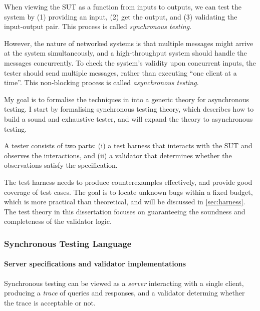 \documentclass{article}
\theoremstyle{definition}
\begin{document}
When viewing the SUT as a function from inputs to outputs, we can test the
system by (1) providing an input, (2) get the output, and (3) validating the
input-output pair.  This process is called {\em synchronous testing}.

However, the nature of networked systems is that multiple messages might arrive
at the system simultaneously, and a high-throughput system should handle the
messages concurrently.  To check the system's validity upon concurrent inputs,
the tester should send multiple messages, rather than executing ``one client at
a time''.  This non-blocking process is called {\em asynchronous testing}.

My goal is to formalise the techniques in \textcite{li2021modelbased} into a generic
theory for asynchronous testing.  I start by formalising synchronous testing
theory, which describes how to build a sound and exhaustive tester, and will
expand the theory to asynchronous testing.

A tester consists of two parts: (i) a test harness that interacts with the SUT
and observes the interactions, and (ii) a validator that determines whether the
observations satisfy the specification.

The test harness needs to produce counterexamples effectively, and provide good
coverage of test cases.  The goal is to locate unknown bugs within a fixed
budget, which is more practical than theoretical, and will be discussed in
\autoref{sec:harness}.  The test theory in this dissertation focuses on
guaranteeing the soundness and completeness of the validator logic.

\subsubsection{Synchronous Testing Language}

\paragraph{Server specifications and validator implementations}
Synchronous testing can be viewed as a {\em server} interacting with a single
client, producing a {\em trace} of queries and responses, and a validator
determing whether the trace is acceptable or not.
\end{document}
